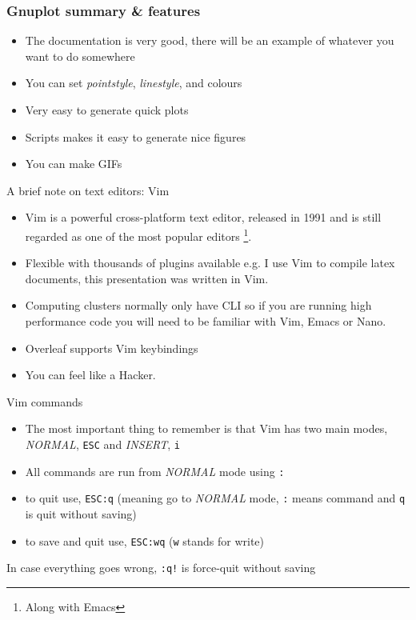 \documentclass{beamer}
\begin{document}
\begin{frame}
    \frametitle{Gnuplot summary \& features}
    \begin{itemize}
        \item The documentation is very good, there will be an example of whatever you want to do somewhere
        \item You can set \textit{pointstyle}, \textit{linestyle}, and colours 
        \item Very easy to generate quick plots
        \item Scripts makes it easy to generate nice figures
        \item You can make GIFs
    \end{itemize}
\end{frame}


\begin{frame}{A brief note on text editors: Vim}
    \begin{itemize}
    \item Vim is a powerful cross-platform text editor, released in 1991 and is still regarded as one of the most popular editors \footnote{Along with Emacs}. 
    \item Flexible with thousands of plugins available e.g. I use Vim to compile latex documents, this presentation was written in Vim.  
    \item Computing clusters normally only have CLI so if you are running high performance code you will need to be familiar with Vim, Emacs or Nano.
    \item Overleaf supports Vim keybindings
    \item You can feel like a Hacker.
\end{itemize}
\end{frame}

\begin{frame}{Vim commands}
    \begin{itemize}
        \item The most important thing to remember is that Vim has two main modes, \textit{NORMAL}, \texttt{ESC} and \textit{INSERT}, \texttt{i}
        \item All commands are run from \textit{NORMAL} mode using \texttt{:}
        \item to quit use, \texttt{ESC:q} (meaning go to \textit{NORMAL} mode, \texttt{:} means command and \texttt{q} is quit without saving)
        \item to save and quit use, \texttt{ESC:wq} (\texttt{w} stands for write)
    \end{itemize}
    In case everything goes wrong, \texttt{:q!} is force-quit without saving
\end{frame}
\end{document}
